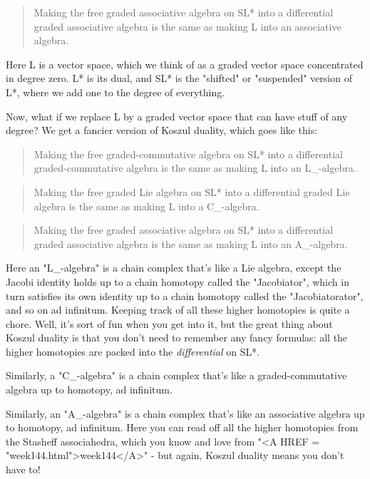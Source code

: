 \begin{quote}
 Making the free graded associative algebra on SL* into a differential
 graded associative algebra is the same as making L into an associative
 algebra.
\end{quote}

Here L is a vector space, which we think of as a graded vector space
concentrated in degree zero.  L* is its dual, and SL* is the
"shifted" or "suspended" version of L*, where we
add one to the degree of everything.

Now, what if we replace L by a graded vector space that can have stuff
of any degree?  We get a fancier version of Koszul duality, which goes
like this:

\begin{quote}
 Making the free graded-commutative algebra on SL* into a differential
 graded-commutative algebra is the same as making L into an L_{\infty }-algebra. 
\end{quote}

\begin{quote}
 Making the free graded Lie algebra on SL* into a differential
 graded Lie algebra is the same as making L into a C_{\infty }-algebra.
\end{quote}

\begin{quote}
 Making the free graded associative algebra on SL* into a differential
 graded associative algebra is the same as making L into an A_{\infty }-algebra.
\end{quote}


Here an "L_{\infty }-algebra" is a chain complex
that's like a Lie algebra, except the Jacobi identity holds up to a
chain homotopy called the "Jacobiator", which in turn
satisfies its own identity up to a chain homotopy called the
"Jacobiatorator", and so on ad infinitum.  Keeping track of
all these higher homotopies is quite a chore.  Well, it's sort of fun
when you get into it, but the great thing about Koszul duality is that
you don't need to remember any fancy formulas: all the higher
homotopies are packed into the \emph{differential} on SL*.
 
Similarly, a "C_{\infty }-algebra" is a chain
complex that's like a graded-commutative algebra up to homotopy, ad
infinitum.

Similarly, an "A_{\infty }-algebra" is a chain
complex that's like an associative algebra up to homotopy, ad
infinitum.  Here you can read off all the higher homotopies from the
Stasheff associahedra, which you know and love from "<A HREF =
"week144.html">week144</A>" - but again, Koszul duality means you
don't have to!

